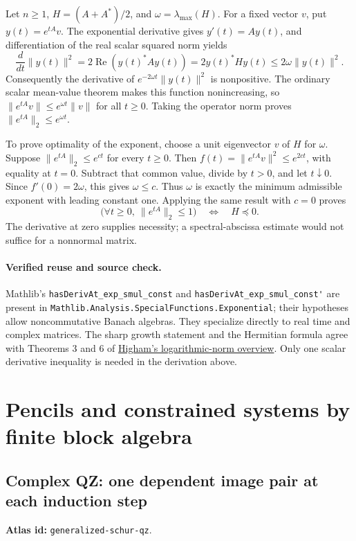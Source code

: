 \documentclass[11pt,a4paper]{article}
\DeclareRobustCommand{\code}[1]{{\footnotesize\urlstyle{tt}\nolinkurl{#1}}}
\begin{document}
Let $n\ge1$, $H=(A+A^*)/2$, and $\omega=\lambda_{\max}(H)$.
For a fixed vector $v$, put $y(t)=e^{tA}v$. The exponential derivative
gives $y'(t)=Ay(t)$, and differentiation of the real scalar squared
norm yields
\[
 \frac{d}{dt}\|y(t)\|^2
 =2\operatorname{Re}(y(t)^*Ay(t))
 =2y(t)^*Hy(t)\le2\omega\|y(t)\|^2.
\]
Consequently the derivative of
$e^{-2\omega t}\|y(t)\|^2$ is nonpositive. The ordinary scalar
mean-value theorem makes this function nonincreasing, so
$\|e^{tA}v\|\le e^{\omega t}\|v\|$ for all $t\ge0$.
Taking the operator norm proves $\|e^{tA}\|_2\le e^{\omega t}$.

To prove optimality of the exponent, choose a unit eigenvector $v$ of
$H$ for $\omega$. Suppose $\|e^{tA}\|_2\le e^{ct}$ for every
$t\ge0$. Then $f(t)=\|e^{tA}v\|^2\le e^{2ct}$, with equality at
$t=0$. Subtract that common value, divide by $t>0$, and let
$t\downarrow0$. Since $f'(0)=2\omega$, this gives $\omega\le c$.
Thus $\omega$ is exactly the minimum admissible exponent with leading
constant one. Applying the same result with $c=0$ proves
\[
 \bigl(\forall t\ge0,\ \|e^{tA}\|_2\le1\bigr)
 \quad\Longleftrightarrow\quad H\preceq0.
\]
The derivative at zero supplies necessity; a spectral-abscissa estimate
would not suffice for a nonnormal matrix.

\paragraph{Verified reuse and source check.}
Mathlib's
\code{hasDerivAt_exp_smul_const} and
\code{hasDerivAt_exp_smul_const'} are present in
\code{Mathlib.Analysis.SpecialFunctions.Exponential}; their hypotheses
allow noncommutative Banach algebras. They specialize directly to real
time and complex matrices. The sharp growth statement and the Hermitian
formula agree with Theorems 3 and 6 of
\href{https://nhigham.com/2022/01/18/what-is-the-logarithmic-norm/}
{Higham's logarithmic-norm overview}. Only one scalar derivative
inequality is needed in the derivation above.

\section{Pencils and constrained systems by finite block algebra}
\label{sec:eq-blocks}

\subsection{Complex QZ: one dependent image pair at each induction step}
\label{sec:eq-qz}
\textbf{Atlas id:} \code{generalized-schur-qz}.
\end{document}
